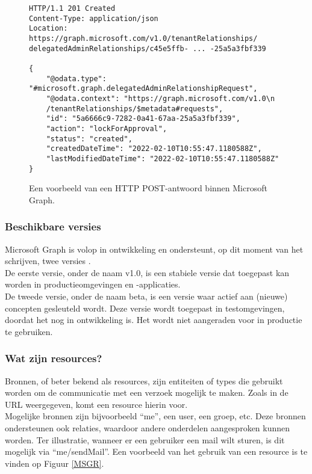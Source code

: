 \begin{figure}[h]
    \footnotesize\begin{verbatim}
HTTP/1.1 201 Created
Content-Type: application/json
Location: https://graph.microsoft.com/v1.0/tenantRelationships/
delegatedAdminRelationships/c45e5ffb- ... -25a5a3fbf339

{
    "@odata.type": "#microsoft.graph.delegatedAdminRelationshipRequest",
    "@odata.context": "https://graph.microsoft.com/v1.0\n
    /tenantRelationships/$metadata#requests",
    "id": "5a6666c9-7282-0a41-67aa-25a5a3fbf339",
    "action": "lockForApproval",
    "status": "created",
    "createdDateTime": "2022-02-10T10:55:47.1180588Z",
    "lastModifiedDateTime": "2022-02-10T10:55:47.1180588Z"
}
    \end{verbatim}    
    \caption[Voorbeeld Microsoft Graph POST-antwoord]{Een voorbeeld van een \ac{HTTP} POST-antwoord binnen Microsoft Graph.}
    \label{MSPRES}
\end{figure}

\subsubsection{Beschikbare versies}

Microsoft Graph is volop in ontwikkeling en ondersteunt, op dit moment van het schrijven, twee versies \Autocite{Microsoft2023f}. \\

De eerste versie, onder de naam v1.0, is een stabiele versie dat toegepast kan worden in productieomgevingen en -applicaties. \\

De tweede versie, onder de naam beta, is een versie waar actief aan (nieuwe) concepten gesleuteld wordt. Deze versie wordt toegepast in testomgevingen, doordat het nog in ontwikkeling is. Het wordt niet aangeraden voor in productie te gebruiken. 

\subsubsection{Wat zijn resources?}

Bronnen, of beter bekend als resources, zijn entiteiten of types die gebruikt worden om de communicatie met een verzoek mogelijk te maken. Zoals in de \ac{URL} weergegeven, komt een resource hierin voor. \\

Mogelijke bronnen zijn bijvoorbeeld “me”, een user, een groep, etc. Deze bronnen ondersteunen ook relaties, waardoor andere onderdelen aangesproken kunnen worden. Ter illustratie, wanneer er een gebruiker een mail wilt sturen, is dit mogelijk via “me/sendMail”. Een voorbeeld van het gebruik van een resource is te vinden op Figuur \ref{MSGR}. \\

